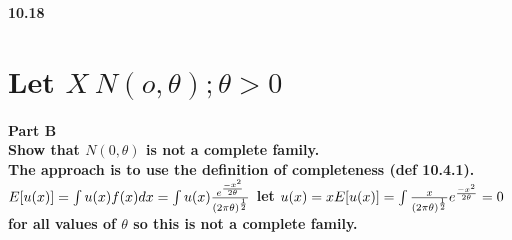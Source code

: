 { \bf 10.18 }
\section*{Let $X~N(o,\theta); \theta >0$}
\paragraph*{Part B\\
Show that $N(0,\theta)$ is not a complete family.\\
The approach is to use the definition of completeness (def 10.4.1).\\
$E[u(x)]=\int u(x)f(x)dx\\
=\int u(x) \frac{e^\frac{-x^2}{2\theta}}{(2\pi \theta)^\frac{1}{2}}\\$
let $u(x)=x\\
E[u(x)]= \int \frac{x}{(2\pi \theta)^\frac{1}{2}}e^\frac{-x^2}{2\theta}\\
= 0$ for all values of $\theta$
so this is not a complete family.}
